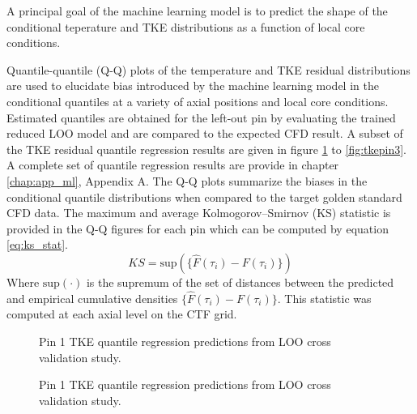 A principal goal of the machine learning model is to predict the shape of the conditional teperature and TKE distributions as a function of local core conditions.

Quantile-quantile (Q-Q) plots of the  temperature and TKE residual distributions are used to elucidate bias introduced by the machine learning model in the conditional quantiles at a variety of axial positions and local core conditions.  Estimated quantiles are obtained for the left-out pin by evaluating the trained reduced LOO model and are compared to the expected CFD result.
A subset of the TKE residual quantile regression results are given in figure \ref{fig:tkepin1} to \ref{fig:tkepin3}.  A complete set of quantile regression results are provide in chapter \ref{chap:app_ml}, Appendix A. The Q-Q plots summarize the biases in the conditional quantile distributions when compared to the target golden standard CFD data.  The maximum and average Kolmogorov–Smirnov (KS) statistic is provided in the Q-Q figures for each pin which can be computed by equation \ref{eq:ks_stat}.
\begin{equation}
KS = \mathrm{sup}(\{\hat F(\tau_i) - F(\tau_i)\})
\label{eq:ks_stat}
\end{equation}
Where $\mathrm{sup}(\cdot)$ is the supremum of the set of distances between the predicted and empirical cumulative densities $\{\hat F(\tau_i) - F(\tau_i)\}$.
This statistic was computed at each axial level on the CTF grid.

\begin{figure}[H]%
    \centering
    \qquad
    \caption[Q-Q LOO TKE pin 1 results.]{Pin 1 TKE quantile regression predictions from LOO cross validation study.}%
    \label{fig:tkepin1}%
\end{figure}

\begin{figure}[H]%
    \centering
    \qquad
    \caption[Q-Q LOO TKE pin 2 results.]{Pin 1 TKE quantile regression predictions from LOO cross validation study.}%
    \label{fig:tkepin2}%
\end{figure}

